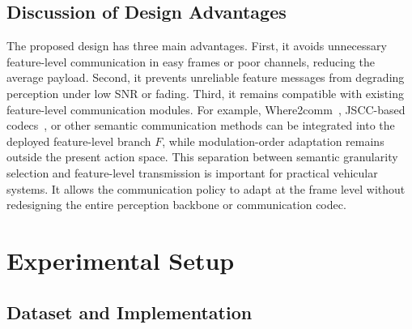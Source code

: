 \documentclass[journal]{IEEEtran}
\begin{document}
\subsection{Discussion of Design Advantages}

The proposed design has three main advantages. First, it avoids unnecessary feature-level communication in easy frames or poor channels, reducing the average payload. Second, it prevents unreliable feature messages from degrading perception under low SNR or fading. Third, it remains compatible with existing feature-level communication modules. For example, Where2comm~\cite{hu2022where2comm}, JSCC-based codecs~\cite{sheng2024importance}, or other semantic communication methods can be integrated into the deployed feature-level branch $F$, while modulation-order adaptation remains outside the present action space. This separation between semantic granularity selection and feature-level transmission is important for practical vehicular systems. It allows the communication policy to adapt at the frame level without redesigning the entire perception backbone or communication codec.

\section{Experimental Setup}\label{sec:exp}

\subsection{Dataset and Implementation}
\end{document}
